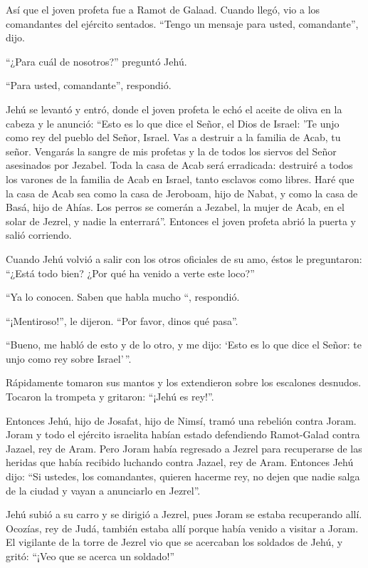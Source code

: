 Así que el joven profeta fue a Ramot de Galaad.
 Cuando llegó, vio a los comandantes del ejército sentados.
``Tengo un mensaje para usted, comandante'', dijo.

``¿Para cuál de nosotros?'' preguntó Jehú.

``Para usted, comandante'', respondió.

 Jehú se levantó y entró, donde el joven profeta le echó el
aceite de oliva en la cabeza y le anunció: ``Esto es lo que dice el
Señor, el Dios de Israel: 'Te unjo como rey del pueblo del Señor,
Israel.  Vas a destruir a la familia de Acab, tu señor.
Vengarás la sangre de mis profetas y la de todos los siervos del Señor
asesinados por Jezabel.  Toda la casa de Acab será
erradicada: destruiré a todos los varones de la familia de Acab en
Israel, tanto esclavos como libres.  Haré que la casa de
Acab sea como la casa de Jeroboam, hijo de Nabat, y como la casa de
Basá, hijo de Ahías.  Los perros se comerán a Jezabel, la
mujer de Acab, en el solar de Jezrel, y nadie la enterrará''. Entonces
el joven profeta abrió la puerta y salió corriendo.

 Cuando Jehú volvió a salir con los otros oficiales de su
amo, éstos le preguntaron: ``¿Está todo bien? ¿Por qué ha venido a verte
este loco?''

``Ya lo conocen. Saben que habla mucho ``, respondió.

 ``¡Mentiroso!'', le dijeron. ``Por favor, dinos qué
pasa''.

``Bueno, me habló de esto y de lo otro, y me dijo: `Esto es lo que dice
el Señor: te unjo como rey sobre Israel'\,''.

 Rápidamente tomaron sus mantos y los extendieron sobre los
escalones desnudos. Tocaron la trompeta y gritaron: ``¡Jehú es rey!''.

 Entonces Jehú, hijo de Josafat, hijo de Nimsí, tramó una
rebelión contra Joram. Joram y todo el ejército israelita habían estado
defendiendo Ramot-Galad contra Jazael, rey de Aram.  Pero
Joram había regresado a Jezrel para recuperarse de las heridas que había
recibido luchando contra Jazael, rey de Aram. Entonces Jehú dijo: ``Si
ustedes, los comandantes, quieren hacerme rey, no dejen que nadie salga
de la ciudad y vayan a anunciarlo en Jezrel''.

 Jehú subió a su carro y se dirigió a Jezrel, pues Joram se
estaba recuperando allí. Ocozías, rey de Judá, también estaba allí
porque había venido a visitar a Joram.  El vigilante de la
torre de Jezrel vio que se acercaban los soldados de Jehú, y gritó:
``¡Veo que se acerca un soldado!''

